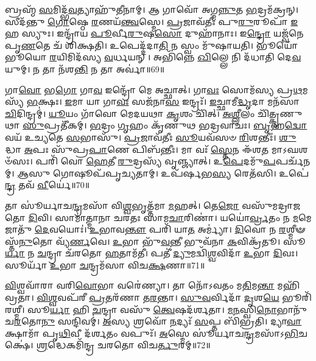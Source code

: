 𑌬𑍍𑌰𑌹𑍍𑌮᳴ \ul{𑌸}\-𑌮𑌿𑌦𑍍𑌭᳴\-\ul{𑌵}\-𑌤𑍍𑌯𑌾𑌹𑍁᳴𑌤𑍀𑌨𑌾𑌮𑍍।
𑌆 𑌗𑌾𑌵𑍋᳴ 𑌅𑌗𑍍𑌮\-\ul{𑌨𑍍𑌨𑍁}\-𑌤 \ul{𑌭}\-𑌦𑍍𑌰𑌮᳴𑌕𑍍𑌰𑌨𑍍।
𑌸𑍀𑌦᳴𑌨𑍍𑌤𑍁 \ul{𑌗𑍋}\-𑌷𑍍𑌠𑍇 \ul{𑌰}\-𑌣𑌯᳴\-\ul{𑌨𑍍𑌤𑍍𑌵}\-𑌸𑍍𑌮𑍇।
\-\ul{𑌪𑍍𑌰}\-𑌜𑌾𑌵᳴𑌤𑍀𑌃 𑌪𑍁\-\ul{𑌰𑍁}\-𑌰𑍂𑌪𑌾᳴ \ul{𑌇}\-𑌹 𑌸𑍍𑌯𑍁𑌃।
𑌇𑌨𑍍𑌦𑍍𑌰𑌾᳴𑌯 \ul{𑌪𑍂}\-𑌰𑍍𑌵𑍀\-\ul{𑌰𑍁}\-𑌷\-\ul{𑌸𑍋} 𑌦𑍁𑌹𑌾᳴𑌨𑌾𑌃।
𑌇\-\ul{𑌨𑍍𑌦𑍍𑌰𑍋} 𑌯𑌜𑍍𑌵᳴𑌨𑍇 𑌪𑍃\-\ul{𑌣}\-𑌤𑍇 𑌚᳴ 𑌶𑌿𑌕𑍍𑌷𑌤𑌿।
𑌉𑌪𑍇𑌦𑍍𑌦᳴𑌦𑌾\-\ul{𑌤𑌿} 𑌨 𑌸𑍍𑌵𑌂 𑌮𑍁᳴𑌷𑌾𑌯𑌤𑌿।
𑌭𑍂𑌯𑍋᳴𑌭𑍂𑌯𑍋 \ul{𑌰}\-𑌯𑌿𑌮𑌿𑌦᳴𑌸𑍍𑌯 \ul{𑌵}\-𑌰𑍍𑌧𑌯𑌨𑍍।
𑌅𑌭𑌿᳴𑌨𑍍𑌨𑍇 \ul{𑌖𑌿}\-𑌲𑍍𑌲𑍇 𑌨𑌿 𑌦᳴𑌧𑌾𑌤𑌿 𑌦𑍇\-\ul{𑌵}\-𑌯𑍁𑌮𑍍।
𑌨 𑌤𑌾 𑌨᳴𑌶\-\ul{𑌨𑍍𑌤𑌿} 𑌨 𑌤𑌾 𑌅𑌰𑍍𑌵𑌾॑॥69॥

𑌗𑌾\-\ul{𑌵𑍋} 𑌭\-\ul{𑌗𑍋} 𑌗𑌾\-\ul{𑌵} 𑌇𑌨𑍍𑌦𑍍𑌰𑍋᳴ 𑌮𑍇 𑌅𑌚𑍍𑌛𑌾𑌤𑍍।
𑌗𑌾\-\ul{𑌵𑌃} 𑌸𑍋𑌮᳴𑌸𑍍𑌯 𑌪𑍍𑌰\-\ul{𑌥}\-𑌮𑌸𑍍𑌯᳴ \ul{𑌭}\-𑌕𑍍𑌷𑌃।
\-\ul{𑌇}\-𑌮𑌾 𑌯𑌾 𑌗𑌾\-\ul{𑌵𑌃} 𑌸𑌜᳴𑌨𑌾\-\ul{𑌸} 𑌇𑌨𑍍𑌦𑍍𑌰𑌃᳴।
\-\ul{𑌇}\-𑌚𑍍𑌛𑌾𑌮𑍀\-\ul{𑌦𑍍𑌧𑍃}\-𑌦𑌾 𑌮𑌨᳴𑌸𑌾 \ul{𑌚𑌿}\-𑌦𑌿𑌨𑍍𑌦𑍍𑌰𑌮𑍍॑।
\-\ul{𑌯𑍂}\-𑌯𑌂 𑌗𑌾᳴𑌵𑍋 𑌮𑍇𑌦𑌯𑌥𑌾 \ul{𑌕𑍃}\-𑌶𑌂 𑌚𑌿᳴𑌤𑍍।
\-\ul{𑌅}\-\-\ul{𑌶𑍍𑌲𑍀}\-𑌲𑌂 𑌚𑌿᳴𑌤𑍍𑌕𑍃𑌣𑍁𑌥𑌾 \ul{𑌸𑍁}\-𑌪𑍍𑌰𑌤𑍀᳴𑌕𑌮𑍍।
\-\ul{𑌭}\-𑌦𑍍𑌰𑌂 \ul{𑌗𑍃}\-𑌹𑌂 𑌕𑍃᳴𑌣𑍁𑌥 𑌭𑌦𑍍𑌰𑌵𑌾𑌚𑌃।
\-\ul{𑌬𑍃}\-𑌹\-\ul{𑌦𑍍𑌵𑍋} 𑌵𑌯᳴ 𑌉𑌚𑍍𑌯𑌤𑍇 \ul{𑌸}\-𑌭𑌾𑌸𑍁᳴।
\-\ul{𑌪𑍍𑌰}\-𑌜𑌾𑌵᳴𑌤𑍀𑌃 \ul{𑌸𑍂}\-𑌯𑌵᳴𑌸𑍞 \ul{𑌰𑌿}\-𑌶𑌨𑍍𑌤𑍀𑌃॑।
\-\ul{𑌶𑍁}\-𑌦𑍍𑌧𑌾 \ul{𑌅}\-𑌪𑌃 𑌸𑍁᳴𑌪𑍍𑌰\-\ul{𑌪𑌾}\-𑌣𑍇 𑌪𑌿𑌬᳴𑌨𑍍𑌤𑍀𑌃।
𑌮𑌾 𑌵𑌃᳴ \ul{𑌸𑍍𑌤𑍇}\-𑌨 𑌈᳴𑌶\-\ul{𑌤} 𑌮𑌾𑌽𑌘𑌶𑍞᳴𑌸𑌃।
𑌪𑌰𑌿᳴ 𑌵𑍋 \ul{𑌹𑍇}\-𑌤𑍀 \ul{𑌰𑍁}\-𑌦𑍍𑌰𑌸𑍍𑌯᳴ 𑌵𑍃𑌞𑍍𑌜𑍍𑌯𑌾𑌤𑍍।
𑌉\-\ul{𑌪𑍇}\-𑌦𑌮𑍁᳴\-\ul{𑌪}\-𑌪𑌰𑍍𑌚᳴𑌨𑌮𑍍।
\-\ul{𑌆}\-𑌸𑍁 𑌗𑍋𑌷𑍂𑌪᳴𑌪𑍃𑌚𑍍𑌯𑌤𑌾𑌮𑍍।
𑌉𑌪᳴𑌰𑍍\mbox{}\-\ul{𑌷}\-𑌭\-\ul{𑌸𑍍𑌯} 𑌰𑍇𑌤᳴𑌸𑌿।
𑌉𑌪𑍇॑\-\ul{𑌨𑍍𑌦𑍍𑌰} 𑌤𑌵᳴ \ul{𑌵𑍀}\-𑌰𑍍𑌯𑍇॑॥70॥\anuvakamend[\-\ul{𑌚}\-\-\ul{𑌰𑌾}\-\-\ul{𑌮𑌿} 𑌕𑌨𑍀᳴\-\ul{𑌯𑍋}\-\-𑌽𑌨𑍍𑌯𑌾𑌨𑌰𑍍𑌪𑌿᳴𑌤𑌾 \ul{𑌪}\-𑌦𑌾\-\ul{𑌨𑌿} 𑌯𑌜𑍍𑌵᳴𑌸𑍁 𑌹𑌵𑌾𑌮𑌹𑍇 \ul{𑌵𑌿}\-𑌷𑍍𑌠𑌾 \ul{𑌲𑍋}\-𑌕𑌾𑌃 \ul{𑌸𑍁}\-𑌵𑍀\-\ul{𑌰}\-𑌮\-\ul{𑌰𑍍𑌵𑌾} 𑌪𑌿𑌬᳴\-\ul{𑌨𑍍𑌤𑍀𑌃} 𑌷𑌟𑍍𑌚᳴]

𑌤𑌾 𑌸𑍂॑𑌰𑍍𑌯𑌾𑌚\-\ul{𑌨𑍍𑌦𑍍𑌰}\-𑌮𑌸𑌾᳴ 𑌵𑌿\-\ul{𑌶𑍍𑌵}\-𑌭𑍃𑌤𑍍𑌤᳴𑌮𑌾 \ul{𑌮}\-𑌹𑌤𑍍।
𑌤𑍇\-\ul{𑌜𑍋} 𑌵𑌸𑍁᳴𑌮𑌦𑍍𑌰𑌾𑌜𑌤𑍋 \ul{𑌦𑌿}\-𑌵𑌿।
𑌸𑌾𑌮𑌾॑𑌤𑍍𑌮𑌾𑌨𑌾 𑌚𑌰𑌤𑌃 𑌸𑌾𑌮\-\ul{𑌚𑌾}\-𑌰𑌿𑌣𑌾॑।
𑌯𑌯𑍋॑\-\ul{𑌰𑍍𑌵𑍍𑌰}\-𑌤𑌂 𑌨 \ul{𑌮}\-𑌮𑍇 𑌜𑌾𑌤𑍁᳴ \ul{𑌦𑍇}\-𑌵𑌯𑍋𑌃॑।
\-\ul{𑌉}\-𑌭𑌾𑌵\-\ul{𑌨𑍍𑌤𑍗} 𑌪𑌰𑌿᳴ 𑌯𑌾\-\ul{𑌤} 𑌅𑌰𑍍𑌮𑍍𑌯𑌾॑।
\-\ul{𑌦𑌿}\-𑌵𑍋 𑌨 \ul{𑌰}\-𑌶𑍍𑌮𑍀𑍟𑌸𑍍𑌤᳴\-\ul{𑌨𑍁}\-𑌤𑍋 𑌵𑍍𑌯᳴\-\ul{𑌰𑍍𑌣}\-𑌵𑍇।
\-\ul{𑌉}\-𑌭𑌾 𑌭𑍁᳴\-\ul{𑌵}\-𑌨𑍍𑌤𑍀 𑌭𑍁𑌵᳴𑌨𑌾 \ul{𑌕}\-𑌵𑌿𑌕𑍍𑌰᳴𑌤𑍂।
𑌸𑍂\-\ul{𑌰𑍍𑌯𑌾} 𑌨 \ul{𑌚}\-𑌨𑍍𑌦𑍍𑌰𑌾 𑌚᳴𑌰𑌤𑍋 \ul{𑌹}\-𑌤𑌾𑌮᳴𑌤𑍀।
𑌪𑌤𑍀॑ \ul{𑌦𑍍𑌯𑍁}\-𑌮𑌦𑍍𑌵𑌿᳴\-\ul{𑌶𑍍𑌵}\-𑌵𑌿𑌦𑌾᳴ \ul{𑌉}\-𑌭𑌾 \ul{𑌦𑌿}\-𑌵𑌃।
𑌸𑍂𑌰𑍍𑌯𑌾᳴ \ul{𑌉}\-𑌭𑌾 \ul{𑌚}\-𑌨𑍍𑌦𑍍𑌰𑌮᳴𑌸𑌾 𑌵𑌿𑌚\-\ul{𑌕𑍍𑌷}\-𑌣𑌾॥71॥

\-\ul{𑌵𑌿}\-𑌶𑍍𑌵𑌵𑌾᳴𑌰𑌾 𑌵𑌰𑌿\-\ul{𑌵𑍋}\-𑌭𑌾 𑌵𑌰𑍇॑𑌣𑍍𑌯𑌾।
𑌤𑌾 𑌨𑍋᳴𑌽𑌵𑌤𑌂 𑌮\-\ul{𑌤𑌿}\-𑌮\-\ul{𑌨𑍍𑌤𑌾} 𑌮𑌹𑌿᳴𑌵𑍍𑌰𑌤𑌾।
\-\ul{𑌵𑌿}\-\-\ul{𑌶𑍍𑌵}\-𑌵𑌪᳴𑌰𑍀 \ul{𑌪𑍍𑌰}\-𑌤𑌰᳴𑌣𑌾 𑌤\-\ul{𑌰}\-𑌨𑍍𑌤𑌾।
\-\ul{𑌸𑍁}\-\-\ul{𑌵}\-𑌰𑍍𑌵𑌿𑌦𑌾᳴ \ul{𑌦𑍃}\-𑌶\-\ul{𑌯𑍇} 𑌭𑍂𑌰𑌿᳴𑌰𑌶𑍍𑌮𑍀।
𑌸𑍂\-\ul{𑌰𑍍𑌯𑌾} 𑌹𑌿 \ul{𑌚}\-𑌨𑍍𑌦𑍍𑌰𑌾 𑌵𑌸𑍁᳴ \ul{𑌤𑍍𑌵𑍇}\-𑌷𑌦᳴𑌰𑍍\mbox{}𑌶𑌤𑌾।
\-\ul{𑌮}\-\-\ul{𑌨}\-𑌸𑍍𑌵𑌿\-\ul{𑌨𑍋}\-𑌭𑌾𑌨𑍁᳴𑌚\-\ul{𑌰}\-𑌤𑍋\-\ul{𑌨𑍁} 𑌸𑌨𑍍𑌦𑌿𑌵𑌮𑍍॑।
\-\ul{𑌅}\-𑌸𑍍𑌯 𑌶𑍍𑌰𑌵𑍋᳴ \ul{𑌨}\-𑌦𑍍𑌯𑌃᳴ \ul{𑌸}\-𑌪𑍍𑌤 𑌬𑌿᳴𑌭𑍍𑌰𑌤𑌿।
𑌦𑍍𑌯𑌾\-\ul{𑌵𑌾} 𑌕𑍍𑌷𑌾𑌮𑌾᳴ 𑌪𑍃\-\ul{𑌥𑌿}\-𑌵𑍀 𑌦᳴𑌰𑍍\mbox{}\-\ul{𑌶}\-𑌤𑌂 𑌵𑌪𑍁𑌃᳴।
\-\ul{𑌅}\-𑌸𑍍𑌮𑍇 𑌸𑍂॑𑌰𑍍𑌯𑌾𑌚\-\ul{𑌨𑍍𑌦𑍍𑌰}\-𑌮𑌸𑌾᳴\-𑌽\-\ul{𑌭𑌿}\-𑌚𑌕𑍍𑌷𑍇॑।
\-\ul{𑌶𑍍𑌰}\-𑌦𑍍𑌧𑍇𑌕𑌮𑌿᳴𑌨𑍍𑌦𑍍𑌰 𑌚𑌰𑌤𑍋 𑌵𑌿𑌚\-\ul{𑌰𑍍𑌤𑍁}\-𑌰𑌮𑍍॥72॥

